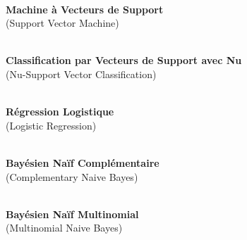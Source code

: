 \begin{description}[style=multiline, leftmargin=2cm, labelindent=1cm]
    \item[SVM] \hfill \\
    \textbf{Machine à Vecteurs de Support} \hfill \\
    (Support Vector Machine)
    
    \item[nu-SVC] \hfill \\
    \textbf{Classification par Vecteurs de Support avec Nu} \hfill \\
    (Nu-Support Vector Classification)
    
    \item[RL] \hfill \\
    \textbf{Régression Logistique} \hfill \\
    (Logistic Regression)
    
    \item[CNB] \hfill \\
    \textbf{Bayésien Naïf Complémentaire} \hfill \\
    (Complementary Naive Bayes)
    
    \item[MNB] \hfill \\
    \textbf{Bayésien Naïf Multinomial} \hfill \\
    (Multinomial Naive Bayes)
\end{description}
